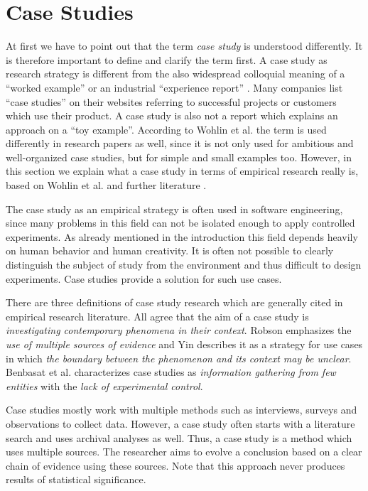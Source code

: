 \documentclass[runningheads]{llncs}
\begin{document}
\section{Case Studies}\label{case-studies}
At first we have to point out that the term \textit{case study} is understood differently. It is therefore important to define and clarify the term first. A case study as research strategy is different from the also widespread colloquial meaning of a ``worked example'' \cite{monperrus2015introduction} or an industrial ``experience report'' \cite{Perry:2006:CSS:1134285.1134497}. Many companies list ``case studies'' on their websites referring to successful projects or customers which use their product. A case study is also not a report which explains an approach on a ``toy example''. According to Wohlin et al. \cite{Wohlin:2012:ESE:2349018} the term is used differently in research papers as well, since it is not only used for ambitious and well-organized case studies, but for simple and small examples too. However, in this section we explain what a case study in terms of empirical research really is, based on Wohlin et al. \cite{Wohlin:2012:ESE:2349018} and further literature \cite{Runeson2008,675630}.

The case study as an empirical strategy is often used in software engineering, since many problems in this field can not be isolated enough to apply controlled experiments. As already mentioned in the introduction this field depends heavily on human behavior and human creativity. It is often not possible to clearly distinguish the subject of study from the environment and thus difficult to design experiments. Case studies provide a solution for such use cases.

There are three definitions of case study research which are generally cited in empirical research literature. All agree that the aim of a case study is \textit{investigating contemporary phenomena in their context}. Robson \cite{robson2002real} emphasizes the \textit{use of multiple sources of evidence} and Yin \cite{yin2009case} describes it as a strategy for use cases in which \textit{the boundary between the phenomenon and its context may be unclear}. Benbasat et al. \cite{Benbasat:1987:CRS:35194.35201} characterizes case studies as \textit{information gathering from few entities} with the \textit{lack of experimental control}.

Case studies mostly work with multiple methods such as interviews, surveys and observations to collect data. However, a case study often starts with a literature search and uses archival analyses as well. Thus, a case study is a method which uses multiple sources. The researcher aims to evolve a conclusion based on a clear chain of evidence using these sources. Note that this approach never produces results of statistical significance.
\end{document}
